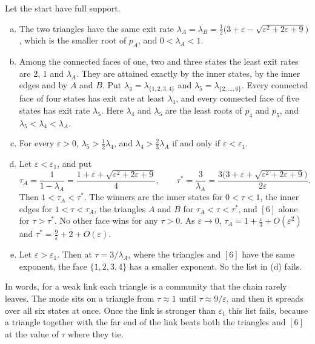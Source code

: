 \documentclass[EJP,preprint]{ejpecp}
\begin{document}
\begin{proposition}\label{prop:triangles}
Let the start have full support.
\begin{enumerate}[(a)]
\item The two triangles have the same exit rate
$\lambda_A=\lambda_B=\frac12\bigl(3+\varepsilon-\sqrt{\varepsilon^2+2\varepsilon+9}\bigr)$,
which is the smaller root of $p_A$, and $0<\lambda_A<1$.
\item Among the connected faces of one, two and three states the least exit
rates are $2$, $1$ and $\lambda_A$. They are attained exactly by the inner
states, by the inner edges and by $A$ and $B$. Put
$\lambda_4=\lambda_{\{1,2,3,4\}}$ and $\lambda_5=\lambda_{\{2,\dots,6\}}$. Every
connected face of four states has exit rate at least $\lambda_4$, and every
connected face of five states has exit rate $\lambda_5$. Here $\lambda_4$ and
$\lambda_5$ are the least roots of $p_4$ and $p_5$, and
$\lambda_5<\lambda_4<\lambda_A$.
\item For every $\varepsilon>0$, $\lambda_5>\frac12\lambda_4$, and
$\lambda_4>\frac23\lambda_A$ if and only if $\varepsilon<\varepsilon_1$.
\item Let $\varepsilon<\varepsilon_1$, and put
\[
 \tau_A=\frac1{1-\lambda_A}=\frac{1+\varepsilon+\sqrt{\varepsilon^2+2\varepsilon+9}}4,
 \qquad
 \tau^*=\frac3{\lambda_A}=\frac{3\bigl(3+\varepsilon+\sqrt{\varepsilon^2+2\varepsilon+9}\bigr)}{2\varepsilon}.
\]
Then $1<\tau_A<\tau^*$. The winners are the inner states for $0<\tau<1$, the
inner edges for $1<\tau<\tau_A$, the triangles $A$ and $B$ for
$\tau_A<\tau<\tau^*$, and $[6]$ alone for $\tau>\tau^*$. No other face wins
for any $\tau>0$. As $\varepsilon\to0$,
$\tau_A=1+\frac\varepsilon3+O(\varepsilon^2)$ and
$\tau^*=\frac9\varepsilon+2+O(\varepsilon)$.
\item Let $\varepsilon>\varepsilon_1$. Then at $\tau=3/\lambda_A$, where the
triangles and $[6]$ have the same exponent, the face $\{1,2,3,4\}$ has a
smaller exponent. So the list in (d) fails.
\end{enumerate}
\end{proposition}

In words, for a weak link each triangle is a community that the chain rarely
leaves. The mode sits on a triangle from $\tau\approx1$ until
$\tau\approx9/\varepsilon$, and then it spreads over all six states at once.
Once the link is stronger than $\varepsilon_1$ this list fails, because a
triangle together with the far end of the link beats both the triangles and
$[6]$ at the value of $\tau$ where they tie.
\end{document}
